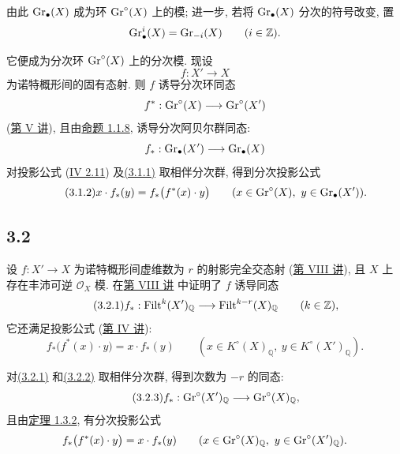 由此 $\operatorname{Gr}_{\bullet}(X)$ 成为环 $\operatorname{Gr}^{\circ}(X)$ 上的模; 进一步, 若将 $\operatorname{Gr}_{\bullet}(X)$ 分次的符号改变, 置
%
%
\[
\operatorname{Gr}^i_\bullet(X)=\operatorname{Gr}_{-i}(X)\qquad(i\in\mathbb Z).
\]

它便成为分次环 $\operatorname{Gr}^{\circ}(X)$ 上的分次模. 现设
\[
f:X'\longrightarrow X
\]
为诺特概形间的固有态射. 则 $f$ 诱导分次环同态
\[
f^*:\operatorname{Gr}^{\circ}(X)\longrightarrow\operatorname{Gr}^{\circ}(X')
\]
(\hyperlink{sga6.e05.expose}{第 V 讲}), 且由\hyperlink{sga6.e10.prop.1-1-8}{命题 1.1.8}, 诱导分次阿贝尔群同态:
\[
f_*:\operatorname{Gr}_{\bullet}(X')\longrightarrow\operatorname{Gr}_{\bullet}(X)
\]
对投影公式 (\hyperlink{sga6.e04.para.2-11}{IV 2.11}) 及\hyperlink{sga6.e10.eq.3-1-1}{(3.1.1)} 取相伴分次群, 得到分次投影公式
%
\begin{equation}\tag{3.1.2}
x\cdot f_*(y)=f_*\bigl(f^*(x)\cdot y\bigr)
\qquad(x\in\operatorname{Gr}^{\circ}(X),\ y\in\operatorname{Gr}_{\bullet}(X')).
\end{equation}

\subsection*{3.2} 设 $f:X'\to X$ 为诺特概形间虚维数为 $r$ 的射影完全交态射 (\hyperlink{sga6.e08.expose}{第 VIII 讲}), 且 $X$ 上存在丰沛可逆 $\mathcal O_X$ 模. 在\hyperlink{sga6.e08.expose}{第 VIII 讲} 中证明了 $f$ 诱导同态
%
%
%
%
\begin{equation}\tag{3.2.1}
f_*:\operatorname{Filt}^k(X')_{\mathbb Q}\longrightarrow
\operatorname{Filt}^{k-r}(X)_{\mathbb Q}\qquad(k\in\mathbb Z),
\end{equation}
它还满足投影公式 (\hyperlink{sga6.e04.expose}{第 IV 讲}):
\begin{equation}\tag{3.2.2}
f_*\bigl(f^*(x)\cdot y\bigr)=x\cdot f_*(y)
\qquad(x\in K^\circ(X)_{\mathbb Q},\ y\in K^\circ(X')_{\mathbb Q}).
\end{equation}

对\hyperlink{sga6.e10.eq.3-2-1}{(3.2.1)} 和\hyperlink{sga6.e10.eq.3-2-2}{(3.2.2)} 取相伴分次群, 得到次数为 $-r$ 的同态:
%
\begin{equation}\tag{3.2.3}
f_*:\operatorname{Gr}^{\circ}(X')_{\mathbb Q}\longrightarrow\operatorname{Gr}^{\circ}(X)_{\mathbb Q},
\end{equation}
且由\hyperlink{sga6.e10.thm.1-3-2}{定理 1.3.2}, 有分次投影公式
\[
f_*\bigl(f^*(x)\cdot y\bigr)=x\cdot f_*(y)
\qquad(x\in\operatorname{Gr}^{\circ}(X)_{\mathbb Q},\ y\in\operatorname{Gr}^{\circ}(X')_{\mathbb Q}).
\]

